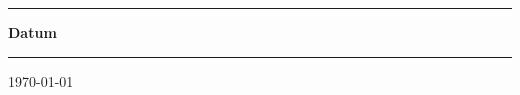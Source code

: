 \begin{titlepage}
\begin{minipage}[b]{0.91\textwidth}


	\begin{minipage}[b]{0.27\textwidth}
	\hrule\vskip 0.5cm
		\textbf{Datum}
	\end{minipage}
	\begin{minipage}[b]{0.03\textwidth}
	\hskip 0.5cm
	\end{minipage}
	\begin{minipage}[b]{0.7\textwidth}
	\hrule\vskip 0.5cm
		\today
	\end{minipage}
\end{minipage}
\vskip 0.5cm

\end{titlepage}
